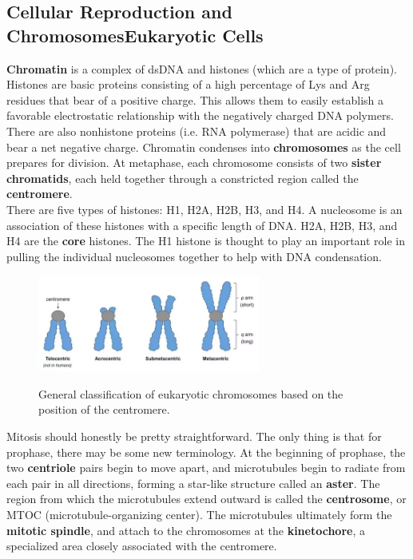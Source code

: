 \documentclass{article}
\theoremstyle{plain}%
\theoremstyle{definition}
\theoremstyle{remark}
\begin{document}
\subsection{Cellular Reproduction and Chromosomes\textemdash Eukaryotic Cells}
\textbf{Chromatin} is a complex of dsDNA and histones (which are a type of protein). Histones are basic proteins consisting of a high percentage of Lys and Arg residues that bear of a positive charge. This allows them to easily establish a favorable electrostatic relationship with the negatively charged DNA polymers. There are also nonhistone proteins (i.e. RNA polymerase) that are acidic and bear a net negative charge. Chromatin condenses into \textbf{chromosomes} as the cell prepares for division. At metaphase, each chromosome consists of two \textbf{sister chromatids}, each held together through a constricted region called the \textbf{centromere}. \\
\indent There are five types of histones: H1, H2A, H2B, H3, and H4. A nucleosome is an association of these histones with a specific length of DNA. H2A, H2B, H3, and H4 are the \textbf{core} histones. The H1 histone is thought to play an important role in pulling the individual nucleosomes together to help with DNA condensation. 
\begin{figure}[h!]
\centering
\includegraphics[width=0.65\textwidth]{chromosome_types.png} \label{chromosome_types}
\caption{General classification of eukaryotic chromosomes based on the position of the centromere.}
\end{figure}
Mitosis should honestly be pretty straightforward. The only thing is that for prophase, there may be some new terminology. At the beginning of prophase, the two \textbf{centriole} pairs begin to move apart, and microtubules begin to radiate from each pair in all directions, forming a star-like structure called an \textbf{aster}. The region from which the microtubules extend outward is called the \textbf{centrosome}, or MTOC (microtubule-organizing center). The microtubules ultimately form the \textbf{mitotic spindle}, and attach to the chromosomes at the \textbf{kinetochore}, a specialized area closely associated with the centromere.
\end{document}
